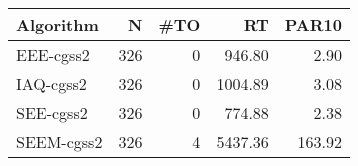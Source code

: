 \begin{tabular}{lrrrr}
\toprule
 Algorithm &   N &  \#TO &      RT &  PAR10 \\
\midrule
 EEE-cgss2 & 326 &    0 &  946.80 &   2.90 \\
 IAQ-cgss2 & 326 &    0 & 1004.89 &   3.08 \\
 SEE-cgss2 & 326 &    0 &  774.88 &   2.38 \\
SEEM-cgss2 & 326 &    4 & 5437.36 & 163.92 \\
\bottomrule
\end{tabular}
